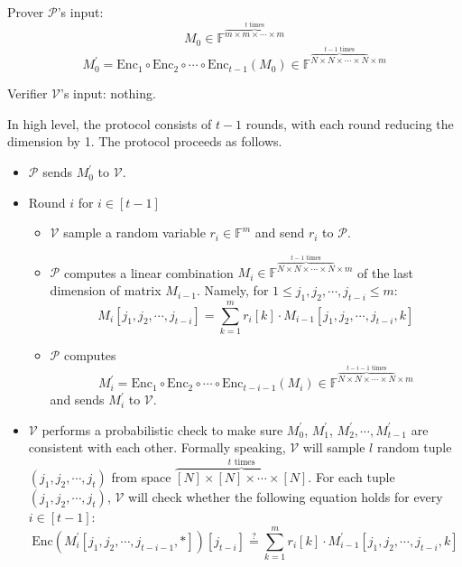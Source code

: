 Prover $\mathcal{P}$'s input: 
$$
    M_0 \in \mathbb{F}^{\overbrace{m \times m \times \cdots \times m}^{t \text{ times}}}
$$
$$
    M_0^{\prime} = \text{Enc}_1 \circ \text{Enc}_2 \circ \cdots \circ \text{Enc}_{t-1}(M_0) \in \mathbb{F}^{\overbrace{N \times N \times \cdots \times N}^{t-1 \text{ times}} \times m}
$$

Verifier $\mathcal{V}$'s input: nothing.

In high level, the protocol consists of $t-1$ rounds, with each round reducing the dimension by 1. The protocol proceeds as follows. 

\begin{itemize}
    \item $\mathcal{P}$ sends $M_0^{\prime}$ to $\mathcal{V}$.
    
    \item Round $i$ for $i \in [t-1]$
    
    \begin{itemize}
        \item $\mathcal{V}$ sample a random variable $r_i \in \mathbb{F}^m$ and send $r_i$ to $\mathcal{P}$.
        \item $\mathcal{P}$ computes a linear combination 
        $M_i \in \mathbb{F}^{\overbrace{N \times N \times \cdots \times N}^{t-1 \text{ times}} \times m}$ of the last dimension of matrix $M_{i-1}$.
        Namely, for $1 \le j_1,j_2, \cdots, j_{t-i} \le m$:
$$
    M_i[j_1,j_2, \cdots, j_{t-i}] = \sum_{k=1}^{m} r_{i}[k] \cdot M_{i-1}[j_1,j_2, \cdots, j_{t-i}, k]
$$

        \item $\mathcal{P}$ computes 
$$
    M_i^\prime = \text{Enc}_1 \circ \text{Enc}_2 \circ \cdots \circ \text{Enc}_{t - i - 1}(M_i)\in \mathbb{F}^{\overbrace{N \times N \times \cdots \times N}^{t-i-1 \text{ times}} \times m}
$$    
        and sends $M_i^\prime$ to $\mathcal{V}$.
    \end{itemize}
    
    \item $\mathcal{V}$ performs a probabilistic check to make sure $M_0^\prime$, $M_1^\prime$, $M_2^\prime, \cdots, M_{t-1}^\prime$ are consistent with each other. Formally speaking, $\mathcal{V}$ will sample $l$ random tuple $(j_1, j_2, \cdots, j_t)$ from space $\overbrace{[N] \times [N] \times \cdots \times [N]}^{t \text{ times}}$. 
    For each tuple $(j_1, j_2, \cdots, j_t)$, 
    $\mathcal{V}$ will check whether the following equation holds for every $i \in [t-1]$:
$$
    \text{Enc}(M_i^\prime[j_1, j_2, \cdots, j_{t-i-1}, *])[j_{t-i}] \stackrel{?}{=} \sum_{k=1}^m r_i[k] \cdot M_{i-1}^{\prime}[j_1,j_2, \cdots, j_{t-i},k]
$$
\end{itemize}

